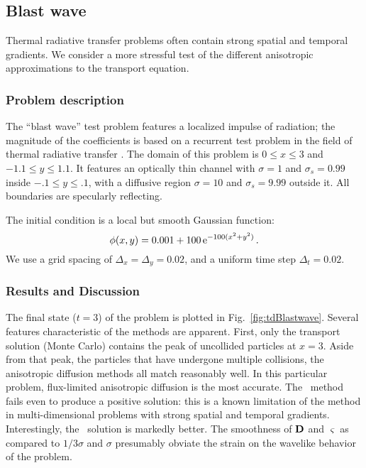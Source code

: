 \clearpage
\subsection{Blast wave}\label{sec:tdBlastwave}

Thermal radiative transfer problems often contain strong spatial and temporal
gradients. We consider a more stressful test of the different anisotropic
approximations to the transport equation.

\subsubsection{Problem description}

The ``blast wave'' test problem features a localized impulse of radiation; the
magnitude of the coefficients is based on a recurrent test problem in the field
of thermal radiative transfer \cite{Kno1999a,Kno2001,Rau2005,Ols2007}. The
domain of this problem is $0 \le x \le 3$ and $-1.1 \le y \le 1.1$.
It features an optically thin channel with $\sigma=1$ and $\sigma_s=0.99$ inside
$-.1 \le y \le .1$, with a diffusive region $\sigma=10$ and $\sigma_s=9.99$
outside it. All boundaries are specularly reflecting.

The initial condition is a local but smooth Gaussian function:
\begin{equation*}
  \phi(x,y) = 0.001 + 100 \mathop{}\!\mathrm{e}^{-100 (x^2 + y^2) }\,.
\end{equation*}
We use a grid spacing of $\Delta_x=\Delta_y=0.02$, and a uniform time step
$\Delta_t=0.02$.

\subsubsection{Results and Discussion}

The final state ($t=3$) of the problem is plotted in Fig.~\ref{fig:tdBlastwave}.
Several features characteristic of the methods are apparent. First, only the
transport solution (Monte Carlo) contains the peak of uncollided particles at
$x=3$. Aside from that peak, the particles that have undergone
multiple collisions, the anisotropic diffusion methods all match reasonably
well. In this particular problem, flux-limited anisotropic diffusion is the most
accurate. The \Pone\ method fails even to produce a positive solution: this is a
known limitation of the method in multi-dimensional problems with strong spatial
and temporal gradients. Interestingly, the \APone\ solution is markedly better.
The smoothness of $\mathbf{D}$ and $\varsigma$ as compared to $1/3\sigma$ and
$\sigma$ presumably obviate the strain on the wavelike behavior of the problem.

